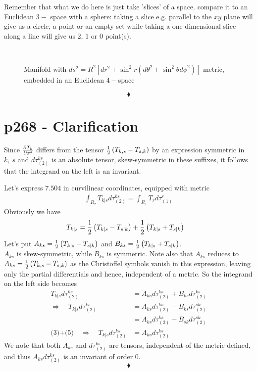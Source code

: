 Remember that what we do here is just take 'slices' of a space. compare it to an Euclidean $3-$ space with a sphere: taking a slice e.g. parallel to the $xy$ plane will give us a circle, a point or an empty set while taking a one-dimensional slice along a line will give us 2, 1 or 0 point(s). 

\begin{figure}[H]%
    \centering
    \subfloat[]{}\\
    \subfloat[]{}
\caption{Manifold with $ds^2=R^2\left[dr^2+\sin^2 r\left(d\theta^2+\sin^2\theta d\phi^2\right)\right]$ metric, embedded in an Euclidean $4-$space}
\label{fig:fig_p265}
\end{figure}
$$\blacklozenge$$
\newpage



\section{p268 - Clarification }
\begin{tcolorbox}
Since $\pdv{T_k}{x^s}$ differs from the tensor $\frac{1}{2}\left(T_{k,s}-T_{s,k}\right)$ by an expression symmetric in $k, \ s$ and $d\tau_{(2)}^{ks}$ is an absolute tensor, skew-symmetric in these suffixes, it follows that the integrand on the left is an invariant.
\end{tcolorbox}
Let's express $\mathbf{7.504}$ in curvilinear coordinates, equipped with metric
\begin{align}
\int_{R_2}T_{k|s}d\tau_{(2)}^{ks} = \int_{R_1}T_{r}d\tau_{(1)}^{r}
\end{align}
Obviously we have 
\begin{align}
T_{k|s}&= \frac{1}{2}\left(T_{k|s}-T_{s|k}\right)+\frac{1}{2}\left(T_{k|s}+T_{s|k}\right)
\end{align}
Let's put $A_{ks}= \frac{1}{2}\left(T_{k|s}-T_{s|k}\right)$ and $B_{ks}= \frac{1}{2}\left(T_{k|s}+T_{s|k}\right)$.\\
$A_{ks}$ is skew-symmetric, while $B_{ks}$ is symmetric.
Note also that $A_{ks}$ reduces to $A_{ks}=\frac{1}{2}\left(T_{k,s}-T_{s,k}\right)$ as the Christoffel symbols vanish in this expression, leaving only the partial differentials and hence, independent of a metric. 
So the integrand  on the left side becomes
\begin{align}
T_{k|s}d\tau_{(2)}^{ks} &= A_{ks}d\tau_{(2)}^{ks}+B_{ks}d\tau_{(2)}^{ks}\\
\Rightarrow\quad T_{k|s}d\tau_{(2)}^{ks} &= A_{ks}d\tau_{(2)}^{ks}-B_{ks}d\tau_{(2)}^{sk}\\
&= A_{ks}d\tau_{(2)}^{ks}-B_{sk}d\tau_{(2)}^{sk}\\
\text{(3)+(5)}\quad\Rightarrow\quad T_{k|s}d\tau_{(2)}^{ks} &= A_{ks}d\tau_{(2)}^{ks}
\end{align}
We note that both $A_{ks}$ and $d\tau_{(2)}^{ks}$ are tensors, independent of the  metric defined, and thus $A_{ks}d\tau_{(2)}^{ks}$ is an invariant of order $0$. 
$$\blacklozenge$$
\newpage


